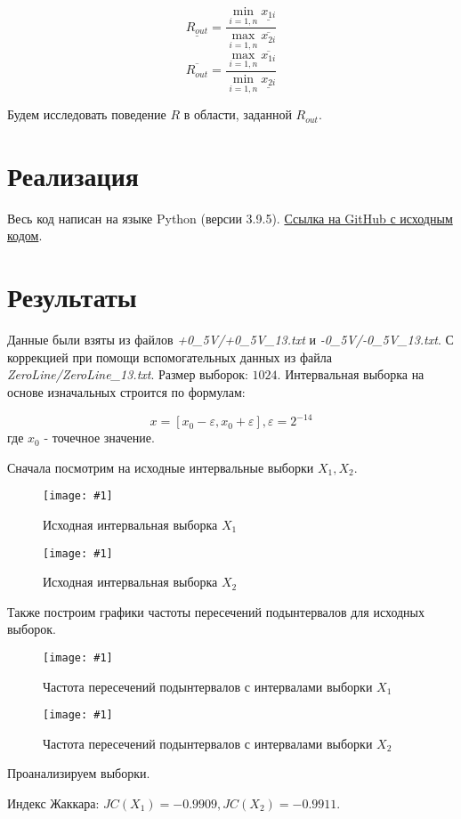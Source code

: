 \documentclass[a4paper,12pt]{article}
\newcommand{\plot}[3]{
    \begin{figure}[H]
        \begin{center}
            \texttt{[image: \#1]}
            \caption{#2}
            \label{#3}
        \end{center}
    \end{figure}
}
\begin{document}
    \begin{equation}
        \underline{R_{out}} = \frac{\min_{i=1,n}\underline{x_{1i}}}{\max_{i=1,n}\overline{x_{2i}}}
    \end{equation}
    \begin{equation}
        \overline{R_{out}} = \frac{\max_{i=1,n}\overline{x_{1i}}}{\min_{i=1,n}\underline{x_{2i}}}
    \end{equation}

    Будем исследовать поведение $ R $ в области, заданной $ R_{out} $.

    \section{Реализация}
    \quad Весь код написан на языке Python (версии 3.9.5).
    \href{https://github.com/BoIlAl/Intervals/tree/master/lab1}{Ссылка на GitHub с исходным кодом}.

    \section{Результаты}
    \quad Данные были взяты из файлов \textsl{+0\_5V/+0\_5V\_13.txt} и
    \textsl{-0\_5V/-0\_5V\_13.txt}. С коррекцией при помощи вспомогательных данных из 
    файла \textsl{ZeroLine/ZeroLine\_13.txt}. Размер выборок: $ 1024 $.
    Интервальная выборка на основе изначальных строится по формулам:
    
    \begin{equation}
        x = [x_0 - \varepsilon, x_0 + \varepsilon], \varepsilon = 2^{-14}
    \end{equation}
    где $ x_0 $ - точечное значение.
    
    Сначала посмотрим на исходные интервальные выборки $ X_1, X_2 $.
    \plot{img/signal 1.png}{Исходная интервальная выборка $ X_1 $}{p:x1}

    \plot{img/signal 2.png}{Исходная интервальная выборка $ X_2 $}{p:x2}

    Также построим графики частоты пересечений подынтервалов для исходных
    выборок.
    \plot{img/signal 1 mode hist.png}{Частота пересечений подынтервалов с интервалами выборки $ X_1 $}{p:modaX1}

    \plot{img/signal 2 mode hist.png}{Частота пересечений подынтервалов с интервалами выборки $ X_2 $}{p:modaX2}
    \quad Проанализируем выборки.
    
    Индекс Жаккара: $ JC(X_1) = -0.9909, JC(X_2) = -0.9911 $.
\end{document}
